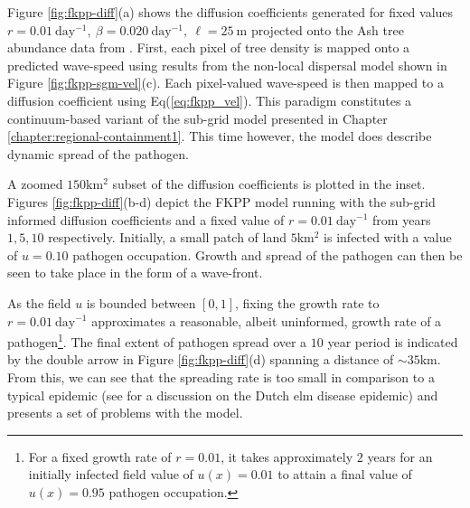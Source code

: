 Figure \ref{fig:fkpp-diff}(a) shows the diffusion coefficients generated for fixed values $r=0.01\ \mathrm{day^{-1}},\ \beta=0.020\ \mathrm{day^{-1}},\ \ell=25\ \mathrm{m}$ projected onto the Ash tree abundance data from \cite{hill.data}. %
First, each pixel of tree density is mapped onto a predicted wave-speed using results from the non-local dispersal model shown in Figure \ref{fig:fkpp-sgm-vel}(c). %
Each pixel-valued wave-speed is then mapped to a diffusion coefficient using Eq(\ref{eq:fkpp_vel}). %
This paradigm constitutes a continuum-based variant of the sub-grid model presented in Chapter \ref{chapter:regional-containment1}. %
This time however, the model does describe dynamic spread of the pathogen. 

A zoomed $150\mathrm{km^2}$ subset of the diffusion coefficients is plotted in the inset. %
Figures \ref{fig:fkpp-diff}(b-d) depict the FKPP model running with the sub-grid informed diffusion coefficients and a fixed value of $r=0.01\ \mathrm{day^{-1}}$ from years $1, 5, 10$ respectively. %
Initially, a small patch of land $5\mathrm{km^2}$ is infected with a value of $u=0.10$ pathogen occupation. Growth and spread of the pathogen can then be seen to take place in the form of a wave-front.  %

As the field $u$ is bounded between $[0, 1]$, fixing the growth rate to $r=0.01\ \mathrm{day^{-1}}$ approximates a reasonable, %
albeit uninformed, growth rate of a pathogen\footnote{For a fixed growth rate of $r=0.01$, it takes approximately $2$ years for an initially infected field value of $u(x)=0.01$ to attain a final value of $u(x)=0.95$ pathogen occupation.}. %
The final extent of pathogen spread over a $10$ year period is indicated by the double arrow in Figure \ref{fig:fkpp-diff}(d) spanning a distance of $\sim 35\mathrm{km}$. %
From this, we can see that the spreading rate is too small in comparison to a typical epidemic (see \cite{dutch-elm-mismanage} for a discussion on the Dutch elm disease epidemic) and presents a set of problems with the model. %


